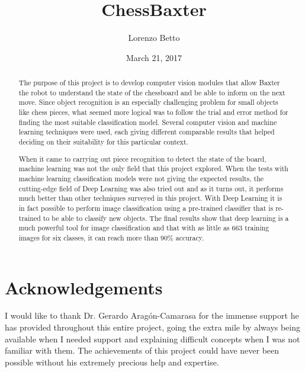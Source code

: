 \documentclass{l4proj}
\begin{document}
\title{ChessBaxter}
\author{Lorenzo Betto}
\date{March 21, 2017}
\maketitle

\begin{abstract}
The purpose of this project is to develop computer vision modules that allow Baxter the robot to understand the state of the chessboard and be able to inform on the next move. Since object recognition is an especially challenging problem for small objects like chess pieces, what seemed more logical was to follow the trial and error method for finding the most suitable classification model. Several computer vision and machine learning techniques were used, each giving different comparable results that helped deciding on their suitability for this particular context. 

When it came to carrying out piece recognition to detect the state of the board, machine learning was not the only field that this project explored. When the tests with machine learning classification models were not giving the expected results, the cutting-edge field of Deep Learning was also tried out and as it turns out, it performs much better than other techniques surveyed in this project. With Deep Learning it is in fact possible to perform image classification using a pre-trained classifier that is re-trained to be able to classify new objects. The final results show that deep learning is a much powerful tool for image classification and that with as little as 663 training images for six classes, it can reach more than 90\% accuracy.



\end{abstract}

\educationalconsent
%
%
\pagebreak
\section*{Acknowledgements}

I would like to thank Dr. Gerardo Arag\'on-Camarasa for the immense support he has provided throughout this entire project, going the extra mile by always being available when I needed support and explaining difficult concepts when I was not familiar with them. The achievements of this project could have never been possible without his extremely precious help and expertise.
\end{document}
